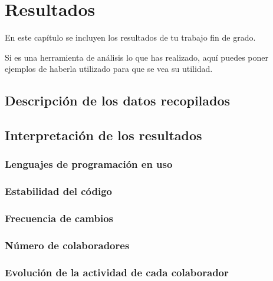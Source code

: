 \documentclass[a4paper, 12pt]{book}
\begin{document}

\cleardoublepage
\chapter{Resultados}
\label{chap:resultados}

En este capítulo se incluyen los resultados de tu trabajo fin de grado.

Si es una herramienta de análisis lo que has realizado, aquí puedes poner ejemplos de haberla utilizado para que se vea su utilidad.

\section{Descripción de los datos recopilados} 
\label{sec:datos-recopilados}

\section{Interpretación de los resultados} 
\label{sec:interpretación-resultados}

\subsection{Lenguajes de programación en uso}
\label{subsec:lenguajes}

\subsection{Estabilidad del código}
\label{subsec:estabilidad-código}

\subsection{Frecuencia de cambios}
\label{subsec:commits}

\subsection{Número de colaboradores}
\label{subsec:número-colaboradores}

\subsection{Evolución de la actividad de cada colaborador}
\label{subsec:actividad-colaborador}
\end{document}
